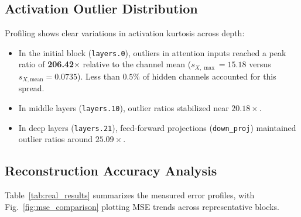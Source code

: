 \documentclass[runningheads,oribibl]{llncs}
\begin{document}
\subsection{Activation Outlier Distribution}
Profiling shows clear variations in activation kurtosis across depth:
\begin{itemize}
    \item In the initial block (\texttt{layers.0}), outliers in attention inputs reached a peak ratio of \textbf{206.42$\times$} relative to the channel mean ($s_{X, \max} = 15.18$ versus $s_{X, \text{mean}} = 0.0735$). Less than $0.5\%$ of hidden channels accounted for this spread.
    \item In middle layers (\texttt{layers.10}), outlier ratios stabilized near $20.18\times$.
    \item In deep layers (\texttt{layers.21}), feed-forward projections (\texttt{down\_proj}) maintained outlier ratios around $25.09\times$.
\end{itemize}

\subsection{Reconstruction Accuracy Analysis}
Table~\ref{tab:real_results} summarizes the measured error profiles, with Fig.~\ref{fig:mse_comparison} plotting MSE trends across representative blocks.
\end{document}
